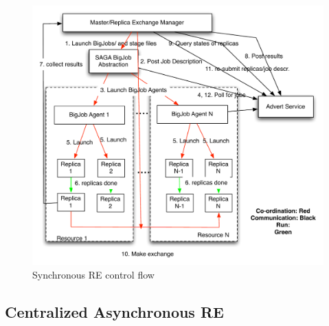 \documentclass[a4paper,10pt]{article}
\begin{document}
\begin{figure}
\centering
\includegraphics[width=1\textwidth]{figures/sync_control_flow.pdf}
\caption{\small Synchronous RE control flow}
\label{fig:async}
\end{figure}

\subsection{Centralized Asynchronous RE}
\end{document}
